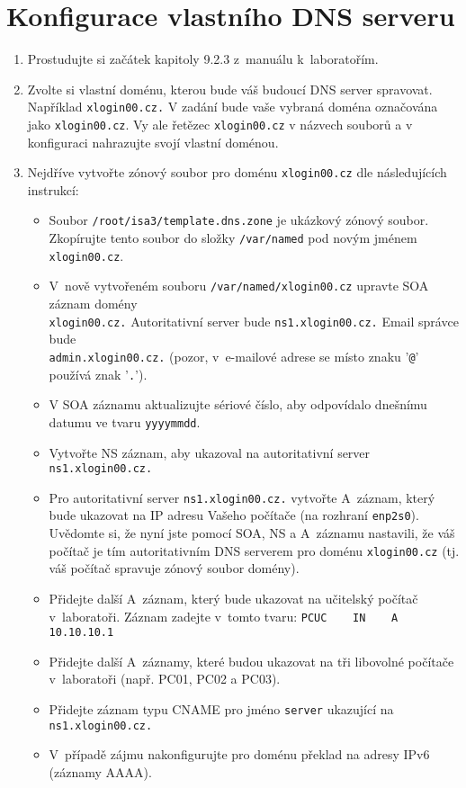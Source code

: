 \section{Konfigurace vlastního DNS serveru}
\begin{enumerate}
  \item Prostudujte si začátek kapitoly 9.2.3 z~manuálu k~laboratořím.
  \item Zvolte si vlastní doménu, kterou bude váš budoucí DNS server spravovat. Například {\tt xlogin00.cz.} V zadání bude vaše vybraná doména označována jako {\tt xlogin00.cz}. Vy ale řetězec {\tt xlogin00.cz} v názvech souborů a v konfiguraci nahrazujte svojí vlastní doménou.

\item Nejdříve vytvořte zónový soubor pro doménu {\tt xlogin00.cz} dle následujících instrukcí:
    \begin{itemize}
      \item Soubor {\tt /root/isa3/template.dns.zone} je ukázkový zónový soubor.\\
            Zkopírujte tento soubor do složky {\tt /var/named} pod novým jménem {\tt xlogin00.cz}.
      \item V~nově vytvořeném souboru {\tt /var/named/xlogin00.cz} upravte SOA záznam domény\\ {\tt xlogin00.cz.} Autoritativní server bude {\tt ns1.xlogin00.cz.}
            Email správce bude\\ {\tt admin.xlogin00.cz.} (pozor, v~e-mailové adrese se místo znaku '{\tt @}' používá znak '{\tt .}').
      \item V SOA záznamu aktualizujte sériové číslo, aby odpovídalo dnešnímu datumu ve tvaru {\tt yyyymmdd}.
      \item Vytvořte NS záznam, aby ukazoval na autoritativní server {\tt ns1.xlogin00.cz.}
      \item Pro autoritativní server {\tt ns1.xlogin00.cz.} vytvořte A~záznam, který bude ukazovat na IP adresu Vašeho počítače (na rozhraní {\tt enp2s0}).
            Uvědomte si, že nyní jste pomocí SOA, NS a A~záznamu nastavili, že váš počítač je tím autoritativním DNS serverem pro doménu {\tt xlogin00.cz} (tj. váš počítač spravuje zónový soubor domény).
      \item Přidejte další A~záznam, který bude ukazovat na učitelský počítač v~laboratoři. Záznam zadejte v~tomto tvaru:
            \verb|PCUC    IN    A    10.10.10.1|
      \item Přidejte další A~záznamy, které budou ukazovat na tři libovolné počítače v~laboratoři (např. PC01, PC02 a PC03).
      \item Přidejte záznam typu CNAME pro jméno {\tt server} ukazující na {\tt ns1.xlogin00.cz.}
      \item V~případě zájmu nakonfigurujte pro doménu překlad na adresy IPv6 (záznamy AAAA).
    \end{itemize}
  

\end{enumerate}
